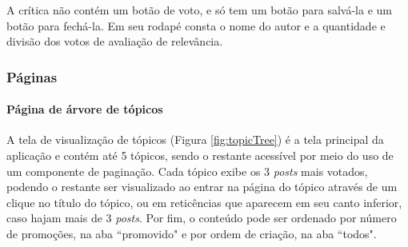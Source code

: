 A crítica não contém um botão de voto, e só tem um botão para salvá-la e um botão para fechá-la. Em seu rodapé consta o nome do autor e a quantidade e divisão dos votos de avaliação de relevância.


\subsubsection{Páginas}

\paragraph{Página de árvore de tópicos}

A tela de visualização de tópicos (Figura \ref{fig:topicTree}) é a tela principal da aplicação e contém até 5 tópicos, sendo o restante acessível por meio do uso de um componente de paginação. Cada tópico exibe os 3 \textit{posts} mais votados, podendo o restante ser visualizado ao entrar na página do tópico através de um clique no título do tópico, ou em reticências que aparecem em seu canto inferior, caso hajam mais de 3 \textit{posts}. Por fim, o conteúdo pode ser ordenado por número de promoções, na aba “promovido" e por ordem de criação, na aba “todos".
